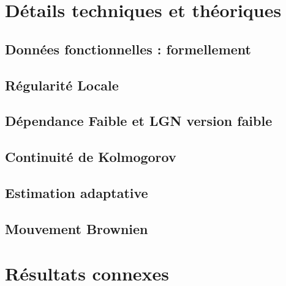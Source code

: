 \chapter{Détails techniques et théoriques}

\section{Données fonctionnelles : formellement}
\label{annexe:fda-formel}


\section{Régularité Locale}
\label{annexe:regularite-locale}

\pagebreak


\section{Dépendance Faible et LGN version faible}
\label{annexe:weak_dep}






\section{Continuité de Kolmogorov}
\label{annexe:continuite_kolmogorov}


\section{Estimation adaptative}
\label{annexe:estim_adapt}


\section{Mouvement Brownien}
\label{annexe:brownien}


\chapter{Résultats connexes}

